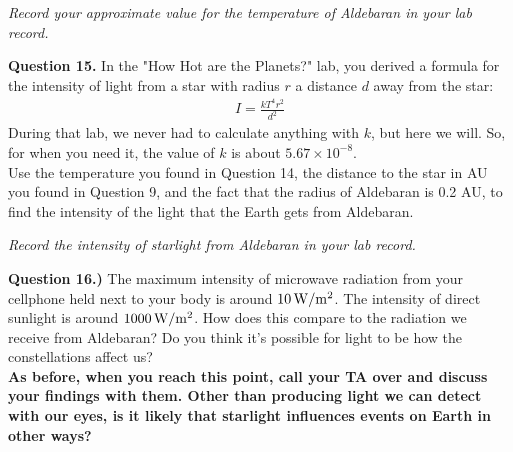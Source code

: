 \documentclass[11pt]{article}
\begin{document}
\vspace{1em}

{\it Record your approximate value for the temperature of Aldebaran in your lab record.}
\vspace{2em}

\textbf{Question 15.} In the "How Hot are the Planets?" lab, you derived a formula for the intensity of light from a star with radius $r$ a distance $d$ away from the star:
\begin{align*}
I=\frac{k T^4r^2}{d^2}
\end{align*} 
During that lab, we never had to calculate anything with $k$, but here we will. So, for when you need it, the value of $k$ is about $5.67\times 10^{-8}$.\\

Use the temperature you found in Question 14, the distance to the star in AU you found in Question 9, and the fact that the radius of Aldebaran is 0.2 AU, to find the intensity of the light that the Earth gets from Aldebaran.\\
%

\vspace{1em}

{\it Record the intensity of starlight from Aldebaran in your lab record.}
\vspace{2em}

\newpage

\textbf{Question 16.)} The maximum intensity of microwave radiation from your cellphone held next to your body is around $10 \rm\, W/m^2$. The intensity of direct sunlight is around $1000 \rm \, W/m^2$. How does this compare to the radiation we receive from Aldebaran? Do you think it's possible for light to be how the constellations affect us?\\

{\bf As before, when you reach this point, call your TA over and discuss your findings with them. Other than producing light we can detect with our eyes, is it likely that starlight influences events on Earth in other ways?}

\vspace{1.5cm}
\hrulefill\\
\end{document}
